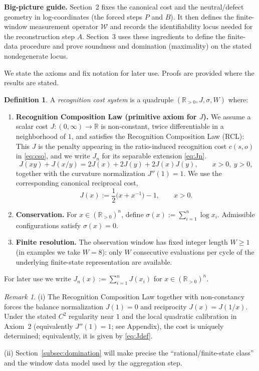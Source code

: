 \documentclass[11pt,reqno]{amsart}
\theoremstyle{definition}
\newtheorem{definition}[theorem]{Definition}
\theoremstyle{remark}
\newtheorem{remark}[theorem]{Remark} %
\newcommand{\Rp}{\mathbb{R}_{>0}}
\newcommand{\1}{\mathbf{1}}
\begin{document}
\medskip
\noindent\textbf{Big-picture guide.} Section~2 fixes the canonical cost and the neutral/defect geometry in log-coordinates (the forced steps $P$ and $B$). It then defines the finite-window measurement operator $\mathcal W$ and records the identifiability locus needed for the reconstruction step $A$. Section~3 uses these ingredients to define the finite-data procedure and prove soundness and domination (maximality) on the stated nondegenerate locus.
\medskip

We state the axioms and fix notation for later use. Proofs are provided where the results are stated. \begin{definition}\label{def:system}
A \emph{recognition cost system} is a quadruple $(\Rp,J,\sigma,W)$ where:
\begin{enumerate}[label=\textup{(C\arabic*)},leftmargin=2.2em]
\item \textbf{Recognition Composition Law (primitive axiom for $J$).}
We assume a scalar cost $J:(0,\infty)\to\mathbb{R}$ is non-constant, twice differentiable in a neighborhood of $1$, and satisfies the Recognition Composition Law (RCL):
This $J$ is the penalty appearing in the ratio-induced recognition cost $c(s,o)$ in \eqref{eq:cso}, and we write $J_n$ for its separable extension \eqref{eq:Jn}.
\begin{equation}\label{eq:RCL}
J(xy)+J(x/y)=2J(x)+2J(y)+2J(x)J(y),\qquad x>0,\ y>0,
\end{equation}
together with the curvature normalization $J''\!(1)=1$.
We use the corresponding canonical reciprocal cost,
\begin{equation}\label{eq:Jdef}
J(x):=\frac12\bigl(x+x^{-1}\bigr)-1,\qquad x>0.
\end{equation}
\item \textbf{Conservation.} For $x\in(\Rp)^n$, define
$\sigma(x):=\sum_{i=1}^n \log x_i$. Admissible configurations satisfy $\sigma(x)=0$.
\item \textbf{Finite resolution.} The observation window has fixed integer length $W\ge 1$ (in examples we take $W=8$):
only $W$ consecutive evaluations per cycle of the underlying finite-state representation
are available.
\end{enumerate}
\end{definition}

\noindent For later use we write $J_n(x):=\sum_{i=1}^n J(x_i)$ for $x\in(\Rp)^n$.

\begin{remark}
(i) The Recognition Composition Law together with non-constancy forces the balance normalization $J(1)=0$ and reciprocity $J(x)=J(1/x)$. Under the stated $C^2$ regularity near $1$ and the local quadratic calibration in Axiom~2 (equivalently $J''(1)=1$; see Appendix), the cost is uniquely determined; equivalently, it is given by \eqref{eq:Jdef}.

(ii) Section~\ref{subsec:domination} will make precise the ``rational/finite-state class'' and the
window data model used by the aggregation step.
\end{remark}
\end{document}
